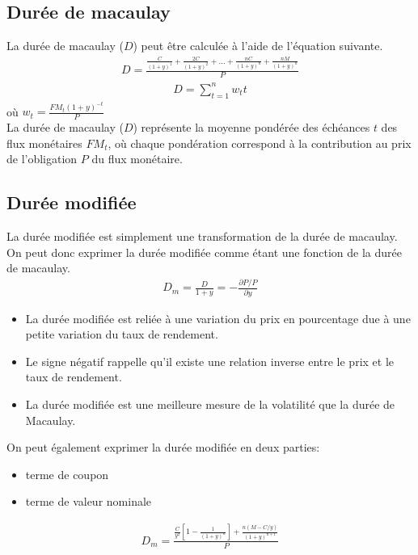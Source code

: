 \documentclass[letterpaper, 12pt]{article}
\newcommand{\1}{\mathds{1}}	%
\theoremstyle{definition}
\begin{document}
\subsection{Durée de macaulay}
La durée de macaulay ($D$) peut être calculée à l'aide de l'équation suivante.
\begin{align*}
D=\frac{\frac{C}{(1+y)^1}+\frac{2C}{(1+y)^2}+...+\frac{nC}{(1+y)^{n}}+\frac{nM}{(1+y)^{n}}}{P}
\end{align*}
\begin{align*}
D=\sum_{t=1}^nw_t t
\end{align*}
où $w_t=\frac{FM_t (1+y)^{-t}}{P}$\\


La durée de macaulay ($D$) représente la moyenne pondérée des échéances $t$ des flux monétaires $FM_t$, où chaque pondération correspond à la contribution au prix de l’obligation $P$ du flux monétaire.
\subsection{Durée modifiée}
La durée modifiée est simplement une transformation de la durée de macaulay. On peut donc exprimer la durée modifiée comme étant une fonction de la durée de macaulay.
\begin{align*}
D_m=\frac{D}{1+y}=-\frac{\partial P/P}{\partial y}
\end{align*}
\begin{itemize}
\item La durée modifiée est reliée à une variation du prix en pourcentage due à une petite variation du taux de rendement.  
\item Le signe négatif rappelle qu’il existe une relation inverse entre le prix et le taux de rendement.  
\item La durée modifiée est une meilleure mesure de la volatilité que la durée de Macaulay. 
\end{itemize}
On peut également exprimer la durée modifiée en deux parties:
\begin{itemize}
\item terme de coupon 
\item terme de valeur nominale
\end{itemize}
\begin{align*}
D_m=\frac{\frac{C}{y^2} \left[ 1-\frac{1}{(1+y)^n} \right]+\frac{n(M-C/y)}{(1+y)^{n+1}}}{P}
\end{align*}
\end{document}

